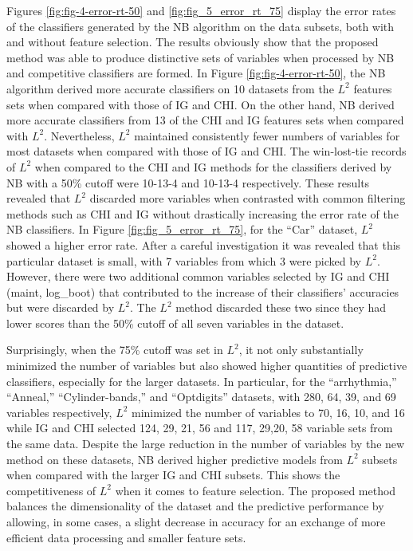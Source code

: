 \documentclass[review]{elsarticle}
\begin{document}
Figures \ref{fig:fig-4-error-rt-50} and \ref{fig:fig_5_error_rt_75} display the error rates of the classifiers generated by the NB algorithm on the data subsets, both with and without feature selection. The results obviously show that the proposed method was able to produce distinctive sets of variables when processed by NB and competitive classifiers are formed. In Figure \ref{fig:fig-4-error-rt-50}, the NB algorithm derived more accurate classifiers on 10 datasets from the $ L^2 $ features sets when compared with those of IG and CHI. On the other hand, NB derived more accurate classifiers from 13 of the CHI and IG features sets when compared with $ L^2 $. Nevertheless, $ L^2 $ maintained consistently fewer numbers of variables for most datasets when compared with those of IG and CHI. The win-lost-tie records of $ L^2 $ when compared to the CHI and IG methods for the classifiers derived by NB with a 50\% cutoff were 10-13-4 and 10-13-4 respectively. These results revealed that $ L^2 $ discarded more variables when contrasted with common filtering methods such as CHI and IG without drastically increasing the error rate of the NB classifiers. In Figure \ref{fig:fig_5_error_rt_75}, for the “Car” dataset, $ L^2 $ showed a higher error rate. After a careful investigation it was revealed that this particular dataset is small, with 7 variables from which 3 were picked by $ L^2 $. However, there were two additional common variables selected by IG and CHI (maint, log\_boot) that contributed to the increase of their classifiers’ accuracies but were discarded by $ L^2 $. The $ L^2 $ method discarded these two since they had lower scores than the 50\% cutoff of all seven variables in the dataset. 

Surprisingly, when the 75\% cutoff was set in $ L^2 $, it not only substantially minimized the number of variables but also showed higher quantities of predictive classifiers, especially for the larger datasets. In particular, for the “arrhythmia,” “Anneal,” “Cylinder-bands,” and “Optdigits” datasets, with 280, 64, 39, and 69 variables respectively, $ L^2 $ minimized the number of variables to 70, 16, 10, and 16 while IG and CHI selected 124, 29, 21, 56 and 117, 29,20, 58  variable sets from the same data. Despite the large reduction in the number of variables by the new method on these datasets, NB derived higher predictive models from $ L^2 $ subsets when compared with the larger IG and CHI subsets. This shows the competitiveness of $ L^2 $ when it comes to feature selection. The proposed method balances the dimensionality of the dataset and the predictive performance by allowing, in some cases, a slight decrease in accuracy for an exchange of more efficient data processing and smaller feature sets. 
\end{document}
